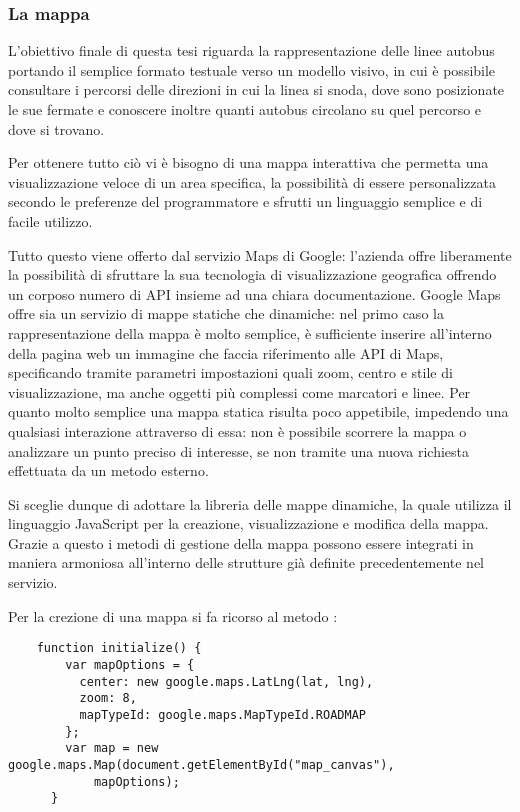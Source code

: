 \subsubsection{La mappa} %
\label{ssub:la_mappa}

L'obiettivo finale di questa tesi riguarda la rappresentazione delle linee autobus portando il semplice formato testuale verso un modello visivo, in cui è possibile consultare i percorsi delle direzioni in cui la linea si snoda, dove sono posizionate le sue fermate e conoscere inoltre quanti autobus circolano su quel percorso e dove si trovano.

Per ottenere tutto ciò vi è bisogno di una mappa interattiva che permetta una visualizzazione veloce di un area specifica, la possibilità di essere personalizzata secondo le preferenze del programmatore e sfrutti un linguaggio semplice e di facile utilizzo.

Tutto questo viene offerto dal servizio Maps di Google: l'azienda offre liberamente la possibilità di sfruttare la sua tecnologia di visualizzazione geografica offrendo un corposo numero di API insieme ad una chiara documentazione.
Google Maps offre sia un servizio di mappe statiche che dinamiche: nel primo caso la rappresentazione della mappa è molto semplice, è sufficiente inserire all'interno della pagina web un immagine che faccia riferimento alle API di Maps, specificando tramite parametri impostazioni quali zoom, centro e stile di visualizzazione, ma anche oggetti più complessi come marcatori e linee.
Per quanto molto semplice una mappa statica risulta poco appetibile, impedendo una qualsiasi interazione attraverso di essa: non è possibile scorrere la mappa o analizzare un punto preciso di interesse, se non tramite una nuova richiesta effettuata da un metodo esterno.

Si sceglie dunque di adottare la libreria delle mappe dinamiche, la quale utilizza il linguaggio JavaScript per la creazione, visualizzazione e modifica della mappa. Grazie a questo i metodi di gestione della mappa possono essere integrati in maniera armoniosa all'interno delle strutture già definite precedentemente nel servizio.

Per la crezione di una mappa si fa ricorso al metodo :

\begin{lstlisting}
    function initialize() {
        var mapOptions = {
          center: new google.maps.LatLng(lat, lng),
          zoom: 8,
          mapTypeId: google.maps.MapTypeId.ROADMAP
        };
        var map = new google.maps.Map(document.getElementById("map_canvas"),
            mapOptions);
      }
\end{lstlisting}


